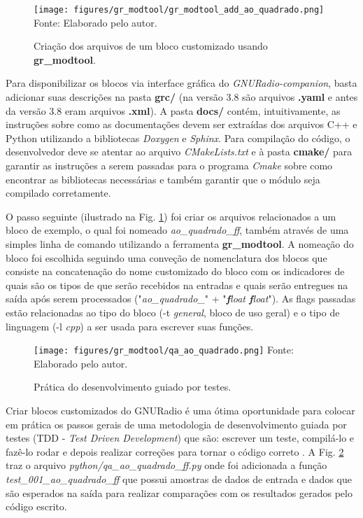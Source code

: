 \documentclass[
  12pt,				%
  openright,			%
  twoside,			%
  a4paper,			%
  english,			%
  french,				%
  spanish,			%
  brazil,				%
  ]{abntex2}
\begin{document}
\begin{figure}[!htb]
  \centering
  \caption{Criação dos arquivos de um bloco customizado usando \textbf{gr\_modtool}.}
  \texttt{[image: figures/gr\_modtool/gr\_modtool\_add\_ao\_quadrado.png]}
  Fonte: Elaborado pelo autor.
  \label{fig:gr_modtool_add_ao_quadrado}
\end{figure}

Para disponibilizar os blocos via interface gráfica do \textit{GNURadio-companion}, basta adicionar suas descrições na pasta \textbf{grc/} (na versão 3.8 são arquivos \textbf{.yaml} e
antes da versão 3.8 eram arquivos \textbf{.xml}). A pasta \textbf{docs/} contém, intuitivamente, as instruções sobre como as documentações devem ser extraídas dos arquivos C++ e Python
utilizando a bibliotecas \textit{Doxygen} e \textit{Sphinx}. Para compilação do código, o desenvolvedor deve se atentar ao arquivo \textit{CMakeLists.txt} e à pasta \textbf{cmake/} para garantir
as instruções a serem passadas para o programa \textit{Cmake} sobre como encontrar as bibliotecas necessárias e também garantir que o módulo seja compilado corretamente.

O passo seguinte (ilustrado na Fig. \ref{fig:gr_modtool_add_ao_quadrado}) foi criar os arquivos relacionados a um bloco de exemplo, o qual foi nomeado \textit{ao\_quadrado\_ff}, também através de uma simples linha de comando utilizando a ferramenta
\textbf{gr\_modtool}. A nomeação do bloco foi escolhida seguindo uma conveção de nomenclatura dos blocos que consiste na concatenação do nome customizado do bloco com os indicadores de quais são
os tipos de que serão recebidos na entradas e quais serão entregues na saída após serem processados ("\textit{ao\_quadrado\_}" + "\textit{\textbf{f}loat \textbf{f}loat}"). As flags passadas
estão relacionadas ao tipo do bloco (-t \textit{general}, bloco de uso geral) e o tipo de linguagem (-l \textit{cpp}) a ser usada para escrever suas funções.

\begin{figure}[!htb]
  \centering
  \caption{Prática do desenvolvimento guiado por testes.}
  \texttt{[image: figures/gr\_modtool/qa\_ao\_quadrado.png]}
  Fonte: Elaborado pelo autor.
  \label{fig:qa_ao_quadrado}
\end{figure}

Criar blocos customizados do GNURadio é uma ótima oportunidade para colocar em prática os passos gerais de uma metodologia de desenvolvimento guiada por testes (TDD -
\textit{Test Driven Development}) que são: escrever um teste, compilá-lo e fazê-lo rodar e depois realizar correções para tornar o código correto \cite{KentBeck:TDD-2002}. A Fig.
\ref{fig:qa_ao_quadrado} traz o arquivo \textit{python/qa\_ao\_quadrado\_ff.py} onde foi adicionada a função \textit{test\_001\_ao\_quadrado\_ff} que possui amostras de dados de
entrada e dados que são esperados na saída para realizar comparações com os resultados gerados pelo código escrito.
\end{document}
